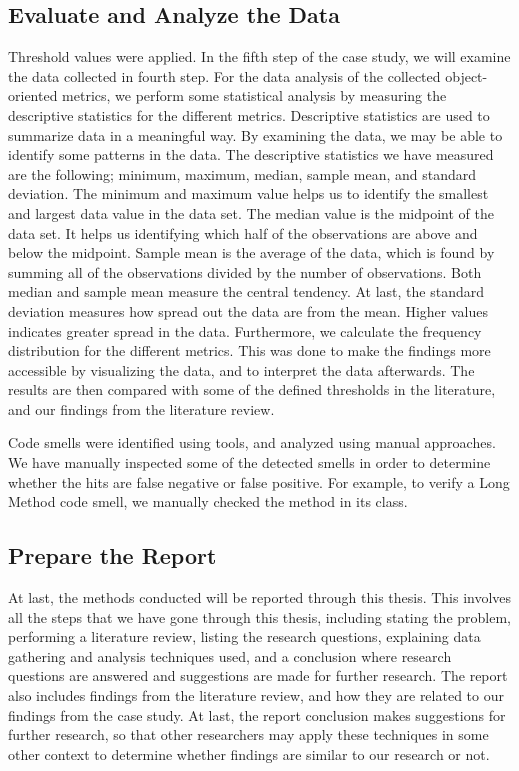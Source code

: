 \subsection{Evaluate and Analyze the Data}

Threshold values were applied.
In the fifth step of the case study, we will examine the data collected in fourth step. For the data analysis of the collected object-oriented metrics, we perform some statistical analysis by measuring the descriptive statistics for the different metrics. Descriptive statistics are used to summarize data in a meaningful way. By examining the data, we may be able to identify some patterns in the data. The descriptive statistics we have measured are the following; minimum, maximum, median, sample mean, and standard deviation. The minimum and maximum value helps us to identify the smallest and largest data value in the data set. The median value is the midpoint of the data set. It helps us identifying which half of the observations are above and below the midpoint. Sample mean is the average of the data, which is found by summing all of the observations divided by the number of observations. Both median and sample mean measure the central tendency. At last, the standard deviation measures how spread out the data are from the mean. Higher values indicates greater spread in the data. Furthermore, we calculate the frequency distribution for the different metrics. This was done to make the findings more accessible by visualizing the data, and to interpret the data afterwards. The results are then compared with some of the defined thresholds in the literature, and our findings from the literature review. 

Code smells were identified using tools, and analyzed using manual approaches. We have manually inspected some of the detected smells in order to determine whether the hits are false negative or false positive. For example, to verify a Long Method code smell, we manually checked the method in its class. 



\subsection{Prepare the Report}
At last, the methods conducted will be reported through this thesis. This involves all the steps that we have gone through this thesis, including stating the problem, performing a literature review, listing the research questions, explaining data gathering and analysis techniques used, and a conclusion where research questions are answered and suggestions are made for further research. The report also includes findings from the literature review, and how they are related to our findings from the case study. At last, the report conclusion makes suggestions for further research, so that other researchers may apply these techniques in some other context to determine whether findings are similar to our research or not.


